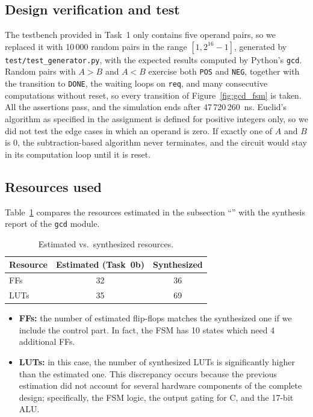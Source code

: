 \subsection{Design verification and test}

The testbench provided in Task~1 only contains five operand pairs, so we replaced it with 10\,000 random pairs in the range $[1, 2^{16}-1]$, generated by \texttt{test/test\_generator.py}, with the expected results computed by Python's \texttt{gcd}.
Random pairs with $A>B$ and $A<B$ exercise both \texttt{POS} and \texttt{NEG}, together with the transition to \texttt{DONE}, the waiting loops on \texttt{req}, and many consecutive computations without reset, so every transition of Figure~\ref{fig:gcd_fsm} is taken.
All the assertions pass, and the simulation ends after 47\,720\,260~ns.
Euclid's algorithm as specified in the assignment is defined for positive integers only, so we did not test the edge cases in which an operand is zero. If exactly one of $A$ and $B$ is $0$, the subtraction-based algorithm never terminates, and the circuit would stay in its computation loop until it is reset.

\subsection{Resources used}

Table~\ref{tab:t2_resources} compares the resources estimated in the subsection ``'' with the synthesis report of the \texttt{gcd} module.

\begin{table}[H]
    \centering
    \small
    \begin{tabular}{lcc}
        \toprule
        Resource & Estimated (Task~0b) & Synthesized \\
        \midrule
        FFs                        & 32 & 36 \\
        LUTs                       & 35 & 69 \\
        \bottomrule
    \end{tabular}
    \caption{Estimated vs.\ synthesized resources.}
    \label{tab:t2_resources}
\end{table}

\begin{itemize}
    \item \textbf{FFs:} the number of estimated flip-flops matches the synthesized one if we include the control part. In fact, the FSM has 10 states which need 4 additional FFs.
    \item \textbf{LUTs:} in this case, the number of synthesized LUTs is significantly higher than the estimated one. This discrepancy occurs because the previous estimation did not account for several hardware components of the complete design; specifically, the FSM logic, the output gating for C, and the 17-bit ALU.
\end{itemize}